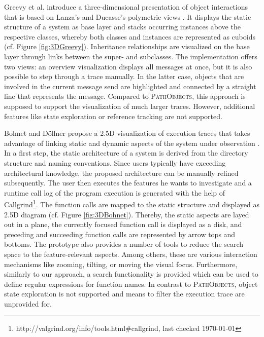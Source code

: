 Greevy et al. introduce a three-dimensional presentation of object interactions \cite{greevy_visualizing_2006} that is based on Lanza's and Ducasse's polymetric views \cite{lanza_polymetric_2003}.
It displays the static structure of a system as base layer and stacks occurring instances above the respective classes, whereby both classes and instances are represented as cuboids (cf. Figure \ref{fig:3DGreevy}).
Inheritance relationships are visualized on the base layer through links between the super- and subclasses.
The implementation offers two views: an overview visualization displays all messages at once, but it is also possible to step through a trace manually.
In the latter case, objects that are involved in the current message send are highlighted and connected by a straight line that represents the message.
Compared to \textsc{PathObjects}, this approach is supposed to support the visualization of much larger traces.
However, additional features like state exploration or reference tracking are not supported.

Bohnet and Döllner propose a 2.5D visualization of execution traces that takes advantage of linking static and dynamic aspects of the system under observation \cite{bohnet_visual_2006}.
In a first step, the static architecture of a system is derived from the directory structure and naming conventions.
Since users typically have exceeding architectural knowledge, the proposed architecture can be manually refined subsequently.
The user then executes the features he wants to investigate and a runtime call log of the program execution is generated with the help of Callgrind\footnote{http://valgrind.org/info/tools.html\#callgrind, last checked \today}.
The function calls are mapped to the static structure and displayed as 2.5D diagram (cf. Figure \ref{fig:3DBohnet}).
Thereby, the static aspects are layed out in a plane, the currently focused function call is displayed as a disk, and preceding and succeeding function calls are represented by arrow tops and bottoms.
The prototype also provides a number of tools to reduce the search space to the feature-relevant aspects.
Among others, these are various interaction mechanisms like zooming, tilting, or moving the visual focus.
Furthermore, similarly to our approach, a search functionality is provided which can be used to define regular expressions for function names.
In contrast to \textsc{PathObjects}, object state exploration is not supported and means to filter the execution trace are unprovided for.

